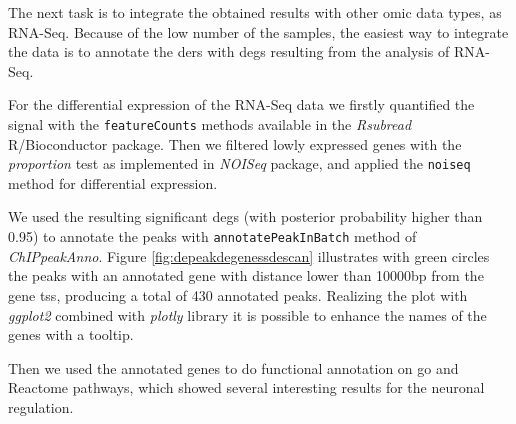 The next task is to integrate the obtained results with other omic data types, as RNA-Seq. 
Because of the low number of the samples, the easiest way to integrate the data is to annotate the \glspl{der} with \glspl{deg} resulting from the analysis of RNA-Seq.

For the differential expression of the RNA-Seq data we firstly quantified the signal with the \lstinline!featureCounts! methods available in the \textit{Rsubread} \cite{Liao2013} R/Bioconductor package.
Then we filtered lowly expressed genes with the \textit{proportion} test  as implemented in \textit{NOISeq} package, and applied the \lstinline!noiseq! method for differential expression.

We used the resulting significant \glspl{deg} (with posterior probability higher than 0.95) to annotate the peaks with \lstinline!annotatePeakInBatch! method of \textit{ChIPpeakAnno}.
Figure 	\ref{fig:depeakdegenessdescan} illustrates with green circles the peaks with an annotated gene with distance lower than 10000bp from the gene \gls{tss}, producing a total of 430 annotated peaks.
Realizing the plot with \textit{ggplot2} combined with \textit{plotly} library it is possible to enhance the names of the genes with a tooltip.

Then we used the annotated genes to do functional annotation on \gls{go} \cite{GeneOntologyConsortium2004, GeneOntologyConsortium2015} and Reactome pathways, which showed several interesting results for the neuronal regulation.








